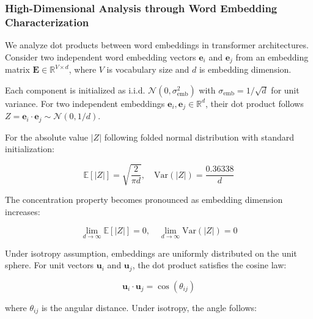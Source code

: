 \documentclass[a4paper]{article}
\theoremstyle{plain}
\theoremstyle{definition}
\theoremstyle{remark}
\begin{document}
\subsubsection{High-Dimensional Analysis through Word Embedding Characterization}

We analyze dot products between word embeddings in transformer architectures. Consider two independent word embedding vectors $\mathbf{e}_i$ and $\mathbf{e}_j$ from an embedding matrix $\mathbf{E} \in \mathbb{R}^{V \times d}$, where $V$ is vocabulary size and $d$ is embedding dimension.

Each component is initialized as i.i.d. $\mathcal{N}(0, \sigma_{\text{emb}}^2)$ with $\sigma_{\text{emb}} = 1/\sqrt{d}$ for unit variance. For two independent embeddings $\mathbf{e}_i, \mathbf{e}_j \in \mathbb{R}^d$, their dot product follows $Z = \mathbf{e}_i \cdot \mathbf{e}_j \sim \mathcal{N}(0, 1/d)$.

\begin{tcolorbox}[colback=blue!10,colframe=blue!80!black,title={\textbf{High-Dimensional Embedding Concentration}},enhanced,drop shadow,boxrule=2pt]
For the absolute value $|Z|$ following folded normal distribution with standard initialization:

\begin{equation}
\boxed{\mathbb{E}[|Z|] = \sqrt{\frac{2}{\pi d}}, \quad \text{Var}(|Z|) = \frac{0.36338}{d}} \label{eq:high_dim_concentration_embeddings}
\end{equation}

The concentration property becomes pronounced as embedding dimension increases:

\begin{equation}
\boxed{\lim_{d \to \infty} \mathbb{E}[|Z|] = 0, \quad \lim_{d \to \infty} \text{Var}(|Z|) = 0} \label{eq:embedding_concentration_limit}
\end{equation}
\end{tcolorbox}

Under isotropy assumption, embeddings are uniformly distributed on the unit sphere. For unit vectors $\mathbf{u}_i$ and $\mathbf{u}_j$, the dot product satisfies the cosine law:

\begin{equation}
\boxed{\mathbf{u}_i \cdot \mathbf{u}_j = \cos(\theta_{ij})} \label{eq:cosine_law_embeddings}
\end{equation}

where $\theta_{ij}$ is the angular distance. Under isotropy, the angle follows:
\end{document}
